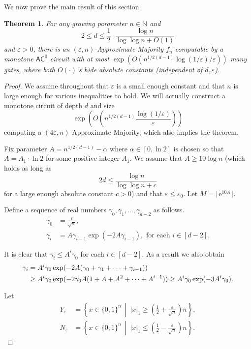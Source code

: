 \documentclass[11pt]{article}
\numberwithin{equation}{section}
\newtheorem{theorem}{Theorem}[section]
\theoremstyle{definition}
\theoremstyle{plain}
\newcommand{\eee}{\mathrm e}
\newcommand{\cclass}[1]{\textsf{#1}}
\newcommand{\eps}{\varepsilon}
\newcommand{\AC}{\cclass{AC}}
\begin{document}
We now prove the main result of this section. 

\begin{theorem}
\label{thm:amano-ckt}
For any growing parameter $n\in \mathbb{N}$ and
\[
  2 \le d \le \frac{1}{2}\cdot \frac{\log n}{\log\log n + O(1)}
\]
and $\eps > 0$, there is an $(\varepsilon,n)$-Approximate Majority
$f_n$ computable by a monotone $\AC^0$ circuit with at most
$\exp(O(n^{1/2(d-1)}\log(1/\varepsilon)/\varepsilon))$ many gates,
where both $O(\cdot)$'s hide absolute constants (independent of
$d,\varepsilon$).
\end{theorem}

\begin{proof}
  We assume throughout that $\varepsilon$ is a small enough constant and that $n$ is large enough for various inequalities to hold. We will actually construct a monotone circuit of depth $d$ and size
  \[
    \exp\left(O\left(n^{1/2(d-1)}\frac{\log(1/\varepsilon)}{\varepsilon}\right)\right)
  \]
  computing a $(4\varepsilon,n)$-Approximate Majority, which also implies the theorem. 

  Fix parameter $A= n^{1/2(d-1)} - \alpha$ where $\alpha \in [0,\ln 2]$ is chosen so that $A = A_1\cdot \ln 2$ for some positive integer $A_1$. We assume that $A\geq 10\log n$ (which holds as long as
  \[
    2d \le \frac{\log n}{\log\log n + c}
  \]
  for a large enough absolute constant $c > 0$) and that
  $\varepsilon \leq \varepsilon_0$. Let $M = \lceil \eee^{10A}\rceil$.


Define a sequence of real numbers $\gamma_0,\gamma_1,\ldots,\gamma_{d-2}$ as follows.
\begin{align*}
\gamma_0 &= \frac{\varepsilon}{\sqrt{n}},\\
\gamma_i &= A\gamma_{i-1}\exp(-2A\gamma_{i-1}), \text{ for each $i\in [d-2]$.}
\end{align*}

It is clear that $\gamma_i \leq A^i \gamma_0$ for each $i\in [d-2]$. As a result we also obtain 
\begin{align}
\gamma_i &= A^i \gamma_0\exp(-2A(\gamma_0+\gamma_1+\cdots+\gamma_{i-1}))\notag\\
&\geq A^i \gamma_0\exp(-2\gamma_0A(1+A+A^2+\cdots+A^{i-1})) \geq A^i\gamma_0\exp(-3A^i\gamma_0).\label{eq:gamma-i}
\end{align}

Let
\begin{align*}
Y_\varepsilon &= \left\{x\in \{0,1\}^n\ \middle|\ |x|_1\geq \left(\frac{1}{2}+\frac{\varepsilon}{\sqrt{n}}\right)n\right\},\\
N_\varepsilon &= \left\{x\in \{0,1\}^n\ \middle|\ |x|_1\leq \left(\frac{1}{2}-\frac{\varepsilon}{\sqrt{n}}\right)n\right\}.
\end{align*}


\end{proof}
\end{document}
